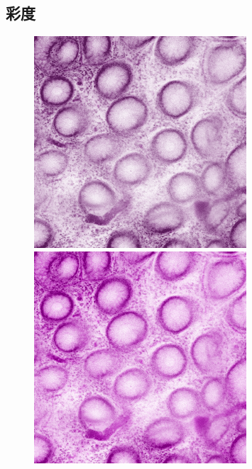 \subsection*{彩度}
\begin{figure}[H]
	\centering

	\begin{minipage}{0.25\columnwidth}
		\centering
		\includegraphics[clip, width=\linewidth]{fig/preprocessing/data_aug/color/SATURATION/SATURATION_0_50}
	\end{minipage}
	\begin{minipage}{0.25\columnwidth}
		\centering
		\includegraphics[clip, width=\linewidth]{fig/preprocessing/data_aug/color/SATURATION/SATURATION_1_00}

\end{minipage}
\end{figure}
